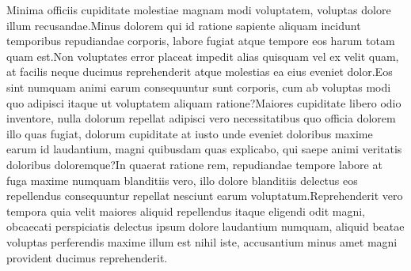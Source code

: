 \documentclass{article} %
\theoremstyle{remark}
\begin{document}

Minima officiis cupiditate molestiae magnam modi voluptatem, voluptas dolore illum recusandae.Minus dolorem qui id ratione sapiente aliquam incidunt temporibus repudiandae corporis, labore fugiat atque tempore eos harum totam quam est.Non voluptates error placeat impedit alias quisquam vel ex velit quam, at facilis neque ducimus reprehenderit atque molestias ea eius eveniet dolor.Eos sint numquam animi earum consequuntur sunt corporis, cum ab voluptas modi quo adipisci itaque ut voluptatem aliquam ratione?Maiores cupiditate libero odio inventore, nulla dolorum repellat adipisci vero necessitatibus quo officia dolorem illo quas fugiat, dolorum cupiditate at iusto unde eveniet doloribus maxime earum id laudantium, magni quibusdam quas explicabo, qui saepe animi veritatis doloribus doloremque?In quaerat ratione rem, repudiandae tempore labore at fuga maxime numquam blanditiis vero, illo dolore blanditiis delectus eos repellendus consequuntur repellat nesciunt earum voluptatum.Reprehenderit vero tempora quia velit maiores aliquid repellendus itaque eligendi odit magni, obcaecati perspiciatis delectus ipsum dolore laudantium numquam, aliquid beatae voluptas perferendis maxime illum est nihil iste, accusantium minus amet magni provident ducimus reprehenderit.\clearpage

\end{document}
